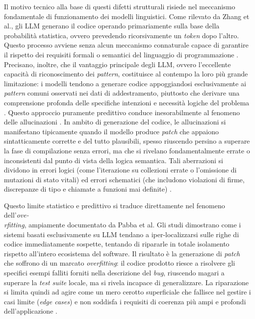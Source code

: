 Il motivo tecnico alla base di questi difetti strutturali risiede nel meccanismo fondamentale di
 funzionamento dei modelli linguistici. Come rilevato da Zhang et al., gli LLM generano il 
 codice operando primariamente sulla base della probabilità statistica, ovvero prevedendo ricorsivamente 
 un \textit{token} dopo l'altro. 
 Questo processo avviene senza alcun meccanismo connaturale capace di garantire il rispetto dei requisiti 
formali o semantici del linguaggio di programmazione \cite{zhang2025semanticforge}.
Precisano, inoltre, che il vantaggio principale degli LLM, ovvero l'eccellente capacità 
di riconoscimento dei \textit{pattern}, costituisce al contempo la loro più grande limitazione: 
i modelli tendono a generare codice appoggiandosi esclusivamente ai \textit{pattern} comuni osservati 
nei dati di addestramento, piuttosto che derivare una comprensione profonda delle specifiche 
intenzioni e necessità logiche del problema \cite{zhang2024llmhallucinations}.
Questo approccio puramente predittivo conduce inesorabilmente al fenomeno delle allucinazioni \cite{zhang2025semanticforge,zhang2024llmhallucinations}.
In ambito di generazione del codice, le allucinazioni si manifestano tipicamente quando il modello 
produce \textit{patch} che appaiono sintatticamente corrette e del tutto plausibili, spesso riuscendo 
persino a superare la fase di compilazione senza errori, ma che si rivelano fondamentalmente 
errate o inconsistenti dal punto di vista della logica semantica. Tali aberrazioni si dividono 
in errori logici (come l'iterazione su collezioni errate o l'omissione di mutazioni di stato vitali) 
ed errori schematici (che includono violazioni di firme, discrepanze di tipo e chiamate a funzioni 
mai definite) \cite{zhang2025semanticforge}.

Questo limite statistico e predittivo si traduce direttamente nel fenomeno dell'\textit{ove-\\rfitting}, 
ampiamente documentato da Pabba et al. Gli studi dimostrano come i sistemi basati esclusivamente 
su LLM tendano a iper-localizzarsi sulle righe di codice immediatamente sospette, tentando 
di ripararle in totale isolamento rispetto all'intero ecosistema del software. Il risultato 
è la generazione di \textit{patch} che soffrono di un marcato \textit{overfitting}: il codice prodotto riesce 
a risolvere gli specifici esempi falliti forniti nella descrizione del \textit{bug}, riuscendo magari 
a superare la \textit{test suite} locale, ma si rivela incapace di generalizzare. La riparazione 
si limita quindi ad agire come un mero cerotto superficiale che fallisce nel gestire i casi 
limite (\textit{edge cases}) e non soddisfa i requisiti di coerenza più ampi e profondi dell'applicazione \cite{pabba2025semagent}.

